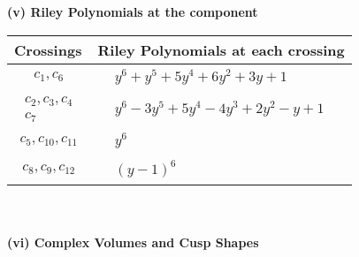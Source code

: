 \documentclass[1p]{elsarticle_modified}
\theoremstyle{definition}
\begin{document}
\newpage\renewcommand{\arraystretch}{1}
\flushleft \textbf{(v) Riley Polynomials at the component}\newline \\
\begin{tabular}{m{50pt}|m{274pt}}
Crossings & \hspace{64pt}Riley Polynomials at each crossing \\
\hline $$\begin{aligned}c_{1},c_{6}\end{aligned}$$&$\begin{aligned}
&y^6+y^5+5 y^4+6 y^2+3 y+1
\end{aligned}$\\
\hline $$\begin{aligned}c_{2},c_{3},c_{4}\\c_{7}\end{aligned}$$&$\begin{aligned}
&y^6-3 y^5+5 y^4-4 y^3+2 y^2- y+1
\end{aligned}$\\
\hline $$\begin{aligned}c_{5},c_{10},c_{11}\end{aligned}$$&$\begin{aligned}
&y^6
\end{aligned}$\\
\hline $$\begin{aligned}c_{8},c_{9},c_{12}\end{aligned}$$&$\begin{aligned}
&(y-1)^6
\end{aligned}$\\
\hline
\end{tabular}\\~\\
\newpage\flushleft \textbf{(vi) Complex Volumes and Cusp Shapes}
\end{document}
